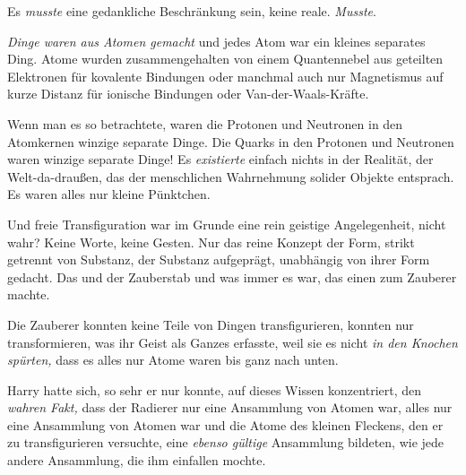 Es \emph{musste} eine gedankliche Beschränkung sein, keine reale. \emph{Musste}.

\emph{Dinge waren aus Atomen gemacht} und jedes Atom war ein kleines separates Ding. Atome wurden zusammengehalten von einem Quantennebel aus geteilten Elektronen für kovalente Bindungen oder manchmal auch nur Magnetismus auf kurze Distanz für ionische Bindungen oder Van-der-Waals-Kräfte.

Wenn man es so betrachtete, waren die Protonen und Neutronen in den Atomkernen winzige separate Dinge. Die Quarks in den Protonen und Neutronen waren winzige separate Dinge! Es \emph{existierte} einfach nichts in der Realität, der Welt-da-draußen, das der menschlichen Wahrnehmung solider Objekte entsprach. Es waren alles nur kleine Pünktchen.

Und freie Transfiguration war im Grunde eine rein geistige Angelegenheit, nicht wahr? Keine Worte, keine Gesten. Nur das reine Konzept der Form, strikt getrennt von Substanz, der Substanz aufgeprägt, unabhängig von ihrer Form gedacht. Das und der Zauberstab und was immer es war, das einen zum Zauberer machte.

Die Zauberer konnten keine Teile von Dingen transfigurieren, konnten nur transformieren, was ihr Geist als Ganzes erfasste, weil sie es nicht \emph{in den Knochen spürten,} dass es alles nur Atome waren bis ganz nach unten.

Harry hatte sich, so sehr er nur konnte, auf dieses Wissen konzentriert, den \emph{wahren Fakt,} dass der Radierer nur eine Ansammlung von Atomen war, alles nur eine Ansammlung von Atomen war und die Atome des kleinen Fleckens, den er zu transfigurieren versuchte, eine \emph{ebenso gültige} Ansammlung bildeten, wie jede andere Ansammlung, die ihm einfallen mochte.

